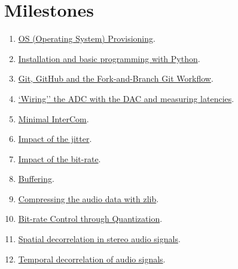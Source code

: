 \section{Milestones}
\begin{enumerate}
\item \href{https://tecnologias-multimedia.github.io/study_guide/01-provisioning/}{OS (Operating System) Provisioning}.
\item \href{https://tecnologias-multimedia.github.io/study_guide/02-python/}{Installation and basic programming with Python}.
\item \href{https://tecnologias-multimedia.github.io/study_guide/03-git/}{Git, GitHub and the Fork-and-Branch Git Workflow}.
\item \href{https://tecnologias-multimedia.github.io/study_guide/04-wiring/}{`Wiring'' the ADC with the DAC and measuring latencies}.
\item \href{https://tecnologias-multimedia.github.io/study_guide/05-minimal/}{Minimal InterCom}.
\item \href{https://tecnologias-multimedia.github.io/study_guide/06-jitter_impact/}{Impact of the jitter}.
\item \href{https://tecnologias-multimedia.github.io/study_guide/07-bit-rate_impact/}{Impact of the bit-rate}.
\item \href{https://tecnologias-multimedia.github.io/study_guide/08-buffering/}{Buffering}.
\item \href{https://tecnologias-multimedia.github.io/study_guide/09-compress/}{Compressing the audio data with zlib}.
\item \href{https://tecnologias-multimedia.github.io/study_guide/10-quantization/}{Bit-rate Control through Quantization}.
\item \href{https://tecnologias-multimedia.github.io/study_guide/11-spatial_decorrelation/}{Spatial decorrelation in stereo audio signals}.
\item \href{https://tecnologias-multimedia.github.io/study_guide/12-temporal_decorrelation/}{Temporal decorrelation of audio signals}.
\end{enumerate}

